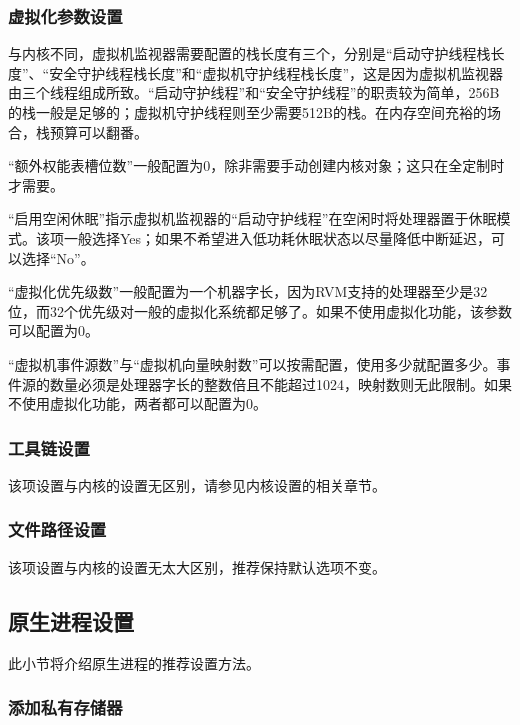 \subsubsection{虚拟化参数设置}\label{subsubsec:6-5-3-2}

与内核不同，虚拟机监视器需要配置的栈长度有三个，分别是``启动守护线程栈长度''、``安全守护线程栈长度''和``虚拟机守护线程栈长度''，这是因为虚拟机监视器由三个线程组成所致。``启动守护线程''和``安全守护线程''的职责较为简单，256B的栈一般是足够的；虚拟机守护线程则至少需要512B的栈。在内存空间充裕的场合，栈预算可以翻番。

``额外权能表槽位数''一般配置为0，除非需要手动创建内核对象；这只在全定制时才需要。

``启用空闲休眠''指示虚拟机监视器的``启动守护线程''在空闲时将处理器置于休眠模式。该项一般选择Yes；如果不希望进入低功耗休眠状态以尽量降低中断延迟，可以选择``No''。

``虚拟化优先级数''一般配置为一个机器字长，因为RVM支持的处理器至少是32位，而32个优先级对一般的虚拟化系统都足够了。如果不使用虚拟化功能，该参数可以配置为0。

``虚拟机事件源数''与``虚拟机向量映射数''可以按需配置，使用多少就配置多少。事件源的数量必须是处理器字长的整数倍且不能超过1024，映射数则无此限制。如果不使用虚拟化功能，两者都可以配置为0。

\subsubsection{工具链设置}\label{subsubsec:6-5-3-3}

该项设置与内核的设置无区别，请参见内核设置的相关章节。

\subsubsection{文件路径设置}\label{subsubsec:6-5-3-4}

该项设置与内核的设置无太大区别，推荐保持默认选项不变。

\subsection{原生进程设置}\label{subsec:6-5-4}

此小节将介绍原生进程的推荐设置方法。

\subsubsection{添加私有存储器}\label{subsubsec:6-5-4-1}

